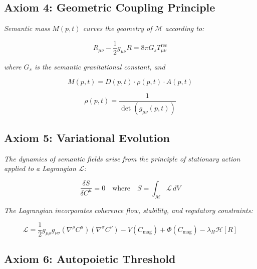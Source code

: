 \subsection{Axiom 4: Geometric Coupling Principle}
\label{1.2.4:axiom_4_geometric_coupling_principle}

\textit{Semantic mass \(M(p,t)\) curves the geometry of \(\mathcal{M}\) according to:}

\begin{equation}
R_{\mu\nu} - \frac{1}{2}g_{\mu\nu}R = 8\pi G_s T^{\text{rec}}_{\mu\nu}
\end{equation}

\textit{where \(G_s\) is the semantic gravitational constant, and}

\begin{equation}
M(p,t) = D(p,t) \cdot \rho(p,t) \cdot A(p,t)
\end{equation}

\begin{equation}
\rho(p,t) = \frac{1}{\det(g_{\mu\nu}(p,t))}
\end{equation}


\subsection{Axiom 5: Variational Evolution}
\label{1.2.5:axiom_5_variational_evolution}

\textit{The dynamics of semantic fields arise from the principle of stationary action applied to a Lagrangian \(\mathcal{L}\):}

\begin{equation}
\frac{\delta S}{\delta C^\mu} = 0 \quad \text{where} \quad S = \int_{\mathcal{M}} \mathcal{L} \, dV
\end{equation}

\textit{The Lagrangian incorporates coherence flow, stability, and regulatory constraints:}

\begin{equation}
\mathcal{L} = \frac{1}{2} g_{\mu\rho} g_{\nu\sigma} (\nabla^\rho C^\mu)(\nabla^\sigma C^\nu) - V(C_{\text{mag}}) + \Phi(C_{\text{mag}}) - \lambda_H \mathcal{H}[R]
\end{equation}


\subsection{Axiom 6: Autopoietic Threshold}
\label{1.2.6:axiom_6_autopoietic_threshold}

